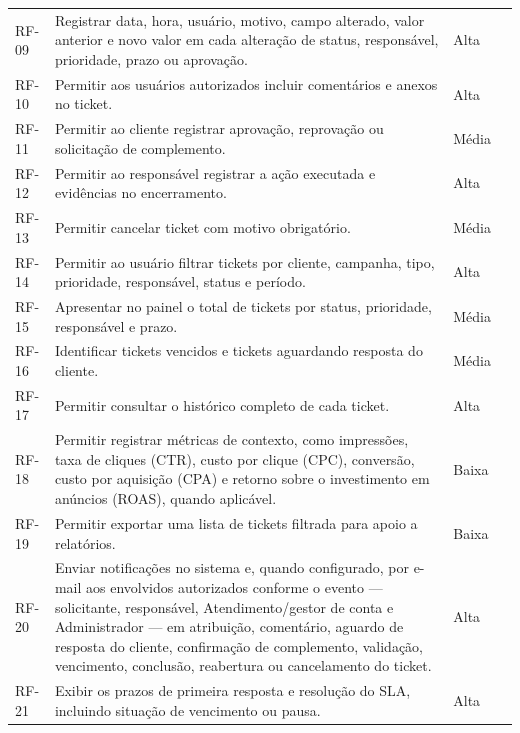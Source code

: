 \begin{longtable}{p{}p{}p{}p{}}
RF-09 & Registrar data, hora, usuário, motivo, campo alterado, valor anterior e novo valor em cada alteração de status, responsável, prioridade, prazo ou aprovação. & Alta & \cite{servicedesk2023,brasil2018} \\
RF-10 & Permitir aos usuários autorizados incluir comentários e anexos no ticket. & Alta & \cite{servicedesk2023} \\
RF-11 & Permitir ao cliente registrar aprovação, reprovação ou solicitação de complemento. & Média & \cite{servicerequest2020,steponaitis2023} \\
RF-12 & Permitir ao responsável registrar a ação executada e evidências no encerramento. & Alta & \cite{servicerequest2020} \\
RF-13 & Permitir cancelar ticket com motivo obrigatório. & Média & \cite{servicerequest2020} \\
RF-14 & Permitir ao usuário filtrar tickets por cliente, campanha, tipo, prioridade, responsável, status e período. & Alta & \cite{abbonizio2023,younas2025} \\
RF-15 & Apresentar no painel o total de tickets por status, prioridade, responsável e prazo. & Média & \cite{abbonizio2023,steponaitis2023} \\
RF-16 & Identificar tickets vencidos e tickets aguardando resposta do cliente. & Média & \cite{servicedesk2023,servicerequest2020} \\
RF-17 & Permitir consultar o histórico completo de cada ticket. & Alta & \cite{servicedesk2023,brasil2018} \\
RF-18 & Permitir registrar métricas de contexto, como impressões, taxa de cliques (CTR), custo por clique (CPC), conversão, custo por aquisição (CPA) e retorno sobre o investimento em anúncios (ROAS), quando aplicável. & Baixa & \cite{yahia2024,nain2025} \\
RF-19 & Permitir exportar uma lista de tickets filtrada para apoio a relatórios. & Baixa & \cite{abbonizio2023,steponaitis2023} \\
RF-20 & Enviar notificações no sistema e, quando configurado, por e-mail aos envolvidos autorizados conforme o evento — solicitante, responsável, Atendimento/gestor de conta e Administrador — em atribuição, comentário, aguardo de resposta do cliente, confirmação de complemento, validação, vencimento, conclusão, reabertura ou cancelamento do ticket. & Alta & \cite{servicedesk2023,servicerequest2020} \\
RF-21 & Exibir os prazos de primeira resposta e resolução do SLA, incluindo situação de vencimento ou pausa. & Alta & \cite{servicedesk2023} \\

\end{longtable}
